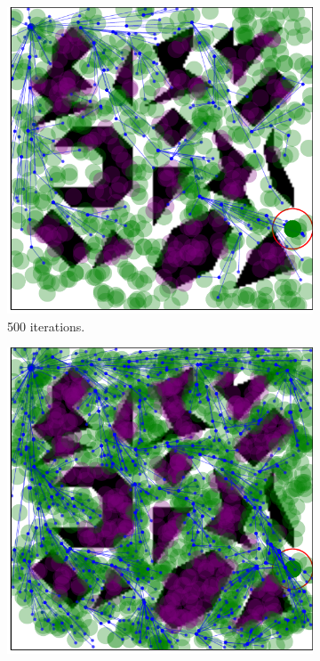 \documentclass{ctuthesis}
\begin{document}
\begin{figure}[!ht]
  \centering
  \begin{subfigure}[b]{0.32\textwidth}
    \includegraphics[width=\textwidth]{figChap5/Maze_clutter_RRTstarML_learning500.pdf}  
    \caption{500 iterations.}
  \end{subfigure}  
  \begin{subfigure}[b]{0.32\textwidth}
    \includegraphics[width=\textwidth]{figChap5/Maze_clutter_RRTstarML_learning1000.pdf}  

\end{subfigure}
\end{figure}
\end{document}
